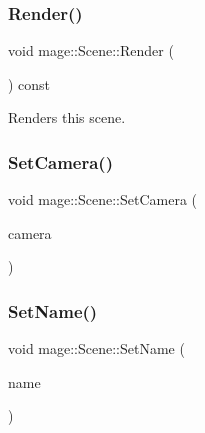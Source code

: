 \hypertarget{classmage_1_1_scene_a98d8af905b60743d40469f71f3acdbf6}{}\label{classmage_1_1_scene_a98d8af905b60743d40469f71f3acdbf6} 
\subsubsection{\texorpdfstring{Render()}{Render()}}
{\footnotesize\ttfamily void mage\+::\+Scene\+::\+Render (\begin{DoxyParamCaption}{ }\end{DoxyParamCaption}) const}

Renders this scene. \hypertarget{classmage_1_1_scene_a57718151e0102306b3abb22da45ae27a}{}\label{classmage_1_1_scene_a57718151e0102306b3abb22da45ae27a} 
\subsubsection{\texorpdfstring{Set\+Camera()}{SetCamera()}}
{\footnotesize\ttfamily void mage\+::\+Scene\+::\+Set\+Camera (\begin{DoxyParamCaption}\item[{\hyperlink{namespacemage_a1e01ae66713838a7a67d30e44c67703e}{Shared\+Ptr}$<$ \hyperlink{classmage_1_1_camera}{Camera} $>$}]{camera }\end{DoxyParamCaption})}

\hypertarget{classmage_1_1_scene_a9b7c1c2f84cc3b3c5ff3de4f29d830e9}{}\label{classmage_1_1_scene_a9b7c1c2f84cc3b3c5ff3de4f29d830e9} 
\subsubsection{\texorpdfstring{Set\+Name()}{SetName()}}
{\footnotesize\ttfamily void mage\+::\+Scene\+::\+Set\+Name (\begin{DoxyParamCaption}\item[{const string \&}]{name }\end{DoxyParamCaption})}

\hypertarget{classmage_1_1_scene_a8751628bf9ed4f15993ca4e8e2ffc966}{}\label{classmage_1_1_scene_a8751628bf9ed4f15993ca4e8e2ffc966} 
